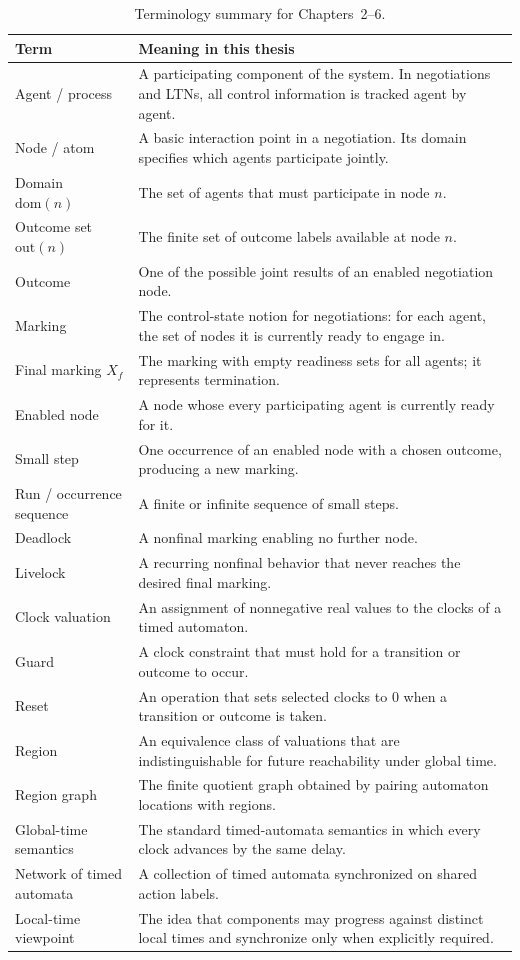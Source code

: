\begin{table}[p]
\centering
\renewcommand{\arraystretch}{1.18}
\begin{tabular}{p{}p{}}
\toprule
\textbf{Term} & \textbf{Meaning in this thesis} \\
\midrule
Agent / process & A participating component of the system. In negotiations and LTNs, all control information is tracked agent by agent. \\
Node / atom & A basic interaction point in a negotiation. Its domain specifies which agents participate jointly. \\
Domain $\mathrm{dom}(n)$ & The set of agents that must participate in node $n$. \\
Outcome set $\mathrm{out}(n)$ & The finite set of outcome labels available at node $n$. \\
Outcome & One of the possible joint results of an enabled negotiation node. \\
Marking & The control-state notion for negotiations: for each agent, the set of nodes it is currently ready to engage in. \\
Final marking $X_f$ & The marking with empty readiness sets for all agents; it represents termination. \\
Enabled node & A node whose every participating agent is currently ready for it. \\
Small step & One occurrence of an enabled node with a chosen outcome, producing a new marking. \\
Run / occurrence sequence & A finite or infinite sequence of small steps. \\
Deadlock & A nonfinal marking enabling no further node. \\
Livelock & A recurring nonfinal behavior that never reaches the desired final marking. \\
Clock valuation & An assignment of nonnegative real values to the clocks of a timed automaton. \\
Guard & A clock constraint that must hold for a transition or outcome to occur. \\
Reset & An operation that sets selected clocks to $0$ when a transition or outcome is taken. \\
Region & An equivalence class of valuations that are indistinguishable for future reachability under global time. \\
Region graph & The finite quotient graph obtained by pairing automaton locations with regions. \\
Global-time semantics & The standard timed-automata semantics in which every clock advances by the same delay. \\
Network of timed automata & A collection of timed automata synchronized on shared action labels. \\
Local-time viewpoint & The idea that components may progress against distinct local times and synchronize only when explicitly required. \\
\bottomrule
\end{tabular}
\caption{Terminology summary for Chapters~2--6.}
\label{tab:terminology-summary}
\end{table}

